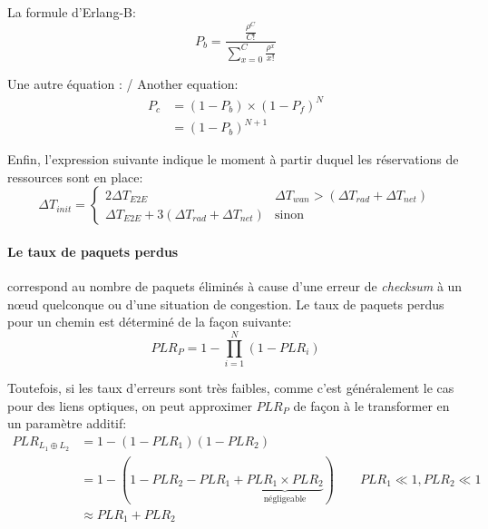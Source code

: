 La formule d'\mbox{Erlang-B}:
\begin{equation}
  P_b = \frac{\frac{\rho^C}{C!}}{\sum\limits_{x=0}^{C}\frac{\rho^x}{x!}}
  \label{eq:Pblock}
\end{equation}

Une autre équation : / Another equation:
\begin{equation}
  \begin{split}
    P_c &= (1 - P_b) \times (1 -  P_f)^N\\
        &= (1 - P_b)^{N+1}
  \end{split}
  \label{eq:ProbComplete}
\end{equation}

Enfin, l'expression suivante indique le moment à partir duquel les
réservations de ressources sont en place:
\begin{equation}
  \Delta{}T_{init} =
  \begin{cases}
    2\Delta{}T_{E2E} & \Delta{}T_{wan} > (\Delta{}T_{rad} + \Delta{}T_{net})\\
    \Delta{}T_{E2E} + 3(\Delta{}T_{rad} + \Delta{}T_{net}) & \text{sinon}
  \end{cases}
  \label{eq:InitCost}
\end{equation}

\paragraph{Le taux de paquets perdus} correspond au nombre de paquets
éliminés à cause d'une erreur de \emph{checksum} à un n\oe{}ud
quelconque ou d'une situation de congestion. Le taux de paquets perdus
pour un chemin est déterminé de la façon suivante:
\begin{equation}
  \label{eq:genPLR}
  PLR_P = 1 - \prod_{i=1}^N(1 - PLR_i)
\end{equation}

Toutefois, si les taux d'erreurs sont très faibles, comme c'est
généralement le cas pour des liens optiques, on peut approximer
$PLR_P$ de façon à le transformer en un paramètre additif:
\begin{equation}
  \label{eq:approxPLR}
  \begin{split}
    PLR_{L_1 \oplus L_2} &= 1 - (1 - PLR_1)(1 - PLR_2)\\
    &= 1 - (1 - PLR_2 - PLR_1 + \underbrace{PLR_1
      \times PLR_2}_\text{négligeable})\qquad PLR_1 \ll 1,
    PLR_2 \ll 1\\
    &\approx PLR_1 + PLR_2
  \end{split}
\end{equation}

